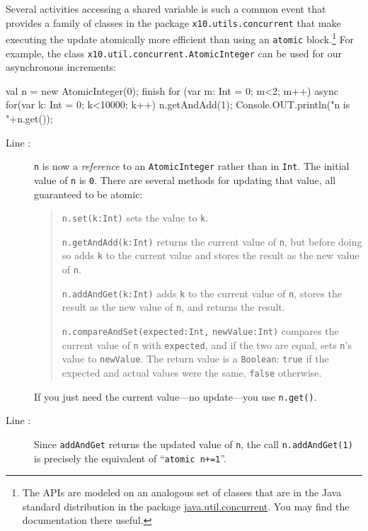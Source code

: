 Several activities accessing a shared variable is such a common event that \Xten{}
provides a family of classes in the package {\tt x10.utils.concurrent} that make
executing the update atomically more
efficient than using an {\tt atomic} block.\footnote{
The APIs are modeled on an analogous set of classes
that are in the Java standard distribution in the package 
\href{http://download.oracle.com/javase/1.5.0/docs/api/java/util/concurrent/atomic/package-summary.html}{java.util.concurrent}.  You may find the documentation there useful.
}
For example,
the class {\tt x10.util.concurrent.AtomicInteger} can be used for our asynchronous
increments:
\begin{xtennum}[]
       val n = new AtomicInteger(0); 
       finish for (var m: Int = 0; m<2; m++) {
           async for(var k: Int = 0; k<10000; k++) n.getAndAdd(1); 
       }
       Console.OUT.println("n is "+n.get());
\end{xtennum}
\begin{description}
\item[Line :]
{\tt n} is now a {\em  reference} to an {\tt AtomicInteger} rather than in {\tt Int}. 
The initial value of {\tt n} is {\tt 0}.  There are several methods for updating
that value, all guaranteed to be atomic:
\begin{quote}
{\tt n.set(k:Int)} sets the value to {\tt k}.

{\tt n.getAndAdd(k:Int)} returns the current value of {\tt n}, but before doing so
adds {\tt k} to the current value and stores the result as the new value of {\tt n}.

{\tt n.addAndGet(k:Int)} adds {\tt k} to the current value of {\tt n}, stores the
result as the new value of {\tt n}, and returns the result.

{\tt n.compareAndSet(expected:Int,} {\tt newValue:Int)} compares the current
value of {\tt n} with {\tt expected}, and if the two are equal, sets 
{\tt n}'s value to {\tt newValue}.  The return value is a {\tt Boolean}:
{\tt true} if the expected and actual values were the same, {\tt false}
otherwise.
\end{quote}
If you just need the current value---no update---you use {\tt n.get()}.
\item[Line :]
Since {\tt addAndGet} returns the updated value of {\tt n}, the call
{\tt n.addAndGet(1)} is precisely the equivalent of ``{\tt atomic n+=1}''.
\end{description}

